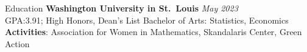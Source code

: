 \begin{rSection}{Education}
  {\bf Washington University in St.\ Louis} \hfill \textit{May 2023} \smallskip \\
  {GPA:\@ 3.91; High Honors, Dean's List} \hfill {Bachelor of Arts: Statistics, Economics} \smallskip \\
  \textbf{Activities}: Association for Women in Mathematics, Skandalaris Center, Green Action

\vspace{-1mm}
\ifx\nocoursework\undefined
\else\fi

\end{rSection}
